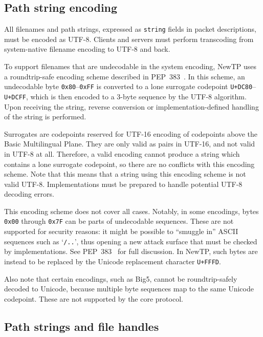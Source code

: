 %

\subsection{Path string encoding}

All filenames and path strings, expressed as {\tt string} fields in packet descriptions, must be encoded as
UTF-8. Clients and servers must perform transcoding from system-native filename encoding to UTF-8 and back.

To support filenames that are undecodable in the system encoding, NewTP uses a roundtrip-safe encoding scheme
described in PEP~383~\cite{pep383}. In this scheme, an undecodable byte {\tt 0x80}--{\tt 0xFF} is converted to
a lone surrogate codepoint {\tt U+DC80}--{\tt U+DCFF}, which is then encoded to a 3-byte sequence by the UTF-8
algorithm. Upon receiving the string, reverse conversion or implementation-defined handling of the string is
performed.

Surrogates are codepoints reserved for UTF-16 encoding of codepoints above the Basic Multilingual Plane. They
are only valid as pairs in UTF-16, and not valid in UTF-8 at all. Therefore, a valid encoding cannot produce
a string which contains a lone surrogate codepoint, so there are no conflicts with this encoding scheme. Note
that this means that a string using this encoding scheme is not valid UTF-8. Implementations must be prepared
to handle potential UTF-8 decoding errors.

This encoding scheme does not cover all cases. Notably, in some encodings, bytes {\tt 0x00} through {\tt 0x7F}
can be parts of undecodable sequences. These are not supported for security reasons: it might be possible to
``smuggle in'' ASCII sequences such as `{\tt /..}', thus opening a new attack surface that must be checked by
implementations. See PEP~383~\cite{pep383} for full discussion. In NewTP, such bytes are instead to be
replaced by the Unicode replacement character {\tt U+FFFD}.

Also note that certain encodings, such as Big5, cannot be roundtrip-safely decoded to Unicode, because
multiple byte sequences map to the same Unicode codepoint. These are not supported by the core protocol.

%

\subsection{Path strings and file handles}
\label{ssec:paths}

